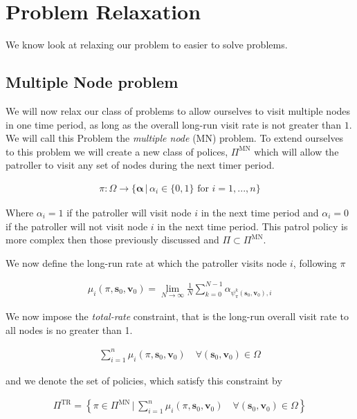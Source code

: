 \documentclass[a4paper,10pt]{article}
\theoremstyle{definition}
\theoremstyle{definition}
\theoremstyle{remark}
\theoremstyle{definition}
\begin{document}
\section{Problem Relaxation}
We know look at relaxing our problem to easier to solve problems.

\subsection{Multiple Node problem}
We will now relax our class of problems to allow ourselves to visit multiple nodes in one time period, as long as the overall long-run visit rate is not greater than $1$. We will call this Problem the \textit{multiple node} (MN) problem. To extend ourselves to this problem we will create a new class of polices, $\Pi^{\text{MN}}$ which will allow the patroller to visit any set of nodes during the next timer period.

\begin{align*}
\pi : \Omega \rightarrow \{\bm{\alpha} \, | \, \alpha_{i} \in \{0,1 \} \text{ for } i=1,...,n \}
\end{align*}

Where $\alpha_{i}=1$ if the patroller will visit node $i$ in the next time period and $\alpha_{i}=0$ if the patroller will not visit node $i$ in the next time period. This patrol policy is more complex then those previously discussed and $\Pi \subset \Pi^{\text{MN}}$.

We now define the long-run rate at which the patroller visits node $i$, following $\pi$

\begin{align*}
\mu_{i}(\pi,\bm{s}_{0},\bm{v}_{0})=\lim\limits_{N \rightarrow \infty} \frac{1}{N} \sum\limits_{k=0}^{N-1} \alpha_{\psi_{\pi}^{k}(\bm{s}_{0},\bm{v}_{0}),i}
\end{align*}

We now impose the \textit{total-rate} constraint, that is the long-run overall visit rate to all nodes is no greater than 1. 

\begin{align*}
\sum\limits_{i=1}^{n} \mu_{i}(\pi,\bm{s}_{0},\bm{v}_{0}) \quad \forall (\bm{s}_{0},\bm{v}_{0}) \in \Omega
\end{align*}

and we denote the set of policies, which satisfy this constraint by

\begin{align*}
\Pi^{\text{TR}}=\left\{ \pi \in \Pi^{\text{MN}} \, \bigg| \, \sum\limits_{i=1}^{n} \mu_{i}(\pi,\bm{s}_{0},\bm{v}_{0}) \quad \forall (\bm{s}_{0},\bm{v}_{0}) \in \Omega \right\}
\end{align*}
\end{document}
